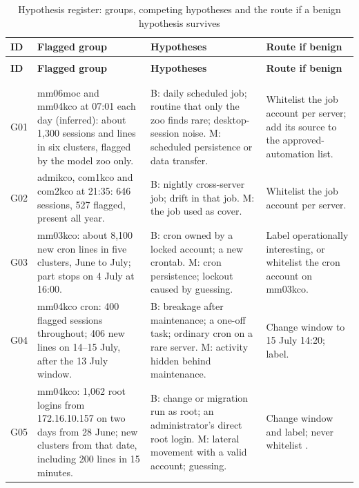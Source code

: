 \documentclass[11pt,a4paper]{article}
\newcommand{\tok}[1]{\texttt{\detokenize{#1}}}
\begin{document}
\begingroup
\footnotesize
\begin{longtable}{>{\RaggedRight\arraybackslash}p{}>{\RaggedRight\arraybackslash}p{}>{\RaggedRight\arraybackslash}p{}>{\RaggedRight\arraybackslash}p{}}
\caption{Hypothesis register: groups, competing hypotheses and the route if a benign hypothesis survives}\label{tab:hypotheses}\\
\toprule
\rowcolor{pale} \textbf{ID} & \textbf{Flagged group} & \textbf{Hypotheses} & \textbf{Route if benign} \\
\midrule
\endfirsthead
\multicolumn{4}{l}{\small\itshape Table \thetable{} --- continued}\\
\toprule
\rowcolor{pale} \textbf{ID} & \textbf{Flagged group} & \textbf{Hypotheses} & \textbf{Route if benign} \\
\midrule
\endhead
\midrule
\multicolumn{4}{r}{\footnotesize Continued on the next page}\\
\endfoot
\bottomrule
\endlastfoot
\multicolumn{4}{l}{\textbf{Authentication}} \\[3pt]
G01 & mm06moc and mm04kco at 07:01 each day (inferred): about 1,300 sessions and lines in six clusters, flagged by the model zoo only. & B: daily scheduled job; routine that only the zoo finds rare; desktop-session noise. M: scheduled persistence or data transfer. & Whitelist the job account per server; add its source to the approved-automation list. \\[3pt]
G02 & admikco, com1kco and com2kco at 21:35: 646 sessions, 527 flagged, present all year. & B: nightly cross-server job; drift in that job. M: the job used as cover. & Whitelist the job account per server. \\[3pt]
G03 & mm03kco: about 8,100 new cron lines in five clusters, June to July; part stops on 4 July at 16:00. & B: cron owned by a locked account; a new crontab. M: cron persistence; lockout caused by guessing. & Label operationally interesting, or whitelist the cron account on mm03kco. \\[3pt]
G04 & mm04kco cron: 400 flagged sessions throughout; 406 new lines on 14--15 July, after the 13 July window. & B: breakage after maintenance; a one-off task; ordinary cron on a rare server. M: activity hidden behind maintenance. & Change window to 15 July 14:20; label. \\[3pt]
G05 & mm04kco: 1,062 root logins from 172.16.10.157 on two days from 28 June; new clusters from that date, including 200 lines in 15 minutes. & B: change or migration run as root; an administrator's direct root login. M: lateral movement with a valid account; guessing. & Change window and label; never whitelist \tok{root}. \\[3pt]

\end{longtable}
\end{document}
